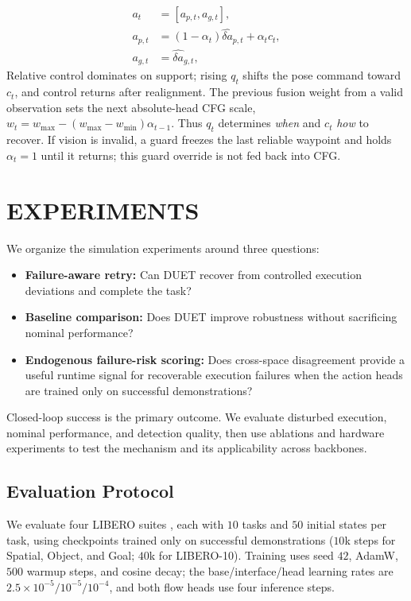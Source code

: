 \documentclass[letterpaper, 10 pt, conference]{ieeeconf}
\begin{document}
\begin{align}
    a_t &= [a_{p,t},a_{g,t}], \\
    a_{p,t} &= (1-\alpha_t)\hat{\delta a}_{p,t} + \alpha_t c_t, \\
    a_{g,t} &= \hat{\delta a}_{g,t},
    \label{eq:fused_action}
\end{align}
Relative control dominates on support; rising $q_t$ shifts the pose command toward $c_t$, and control returns after realignment. The previous fusion weight from a valid observation sets the next absolute-head CFG scale, $w_t = w_{\max}-(w_{\max}-w_{\min})\alpha_{t-1}$. Thus $q_t$ determines \emph{when} and $c_t$ \emph{how} to recover. If vision is invalid, a guard freezes the last reliable waypoint and holds $\alpha_t{=}1$ until it returns; this guard override is not fed back into CFG.

\section{EXPERIMENTS}
\label{sec:experiments}

\begin{samepage}
We organize the simulation experiments around three questions:
\begin{itemize}
    \setlength{\itemsep}{0pt}
    \setlength{\parsep}{0pt}
    \setlength{\topsep}{2pt}
    \item[\textbf{(Q1)}] \textbf{Failure-aware retry:} Can DUET recover from controlled execution deviations and complete the task?
    \item[\textbf{(Q2)}] \textbf{Baseline comparison:} Does DUET improve robustness without sacrificing nominal performance?
    \item[\textbf{(Q3)}] \textbf{Endogenous failure-risk scoring:} Does cross-space disagreement provide a useful runtime signal for recoverable execution failures when the action heads are trained only on successful demonstrations?
\end{itemize}
Closed-loop success is the primary outcome. We evaluate disturbed execution, nominal performance, and detection quality, then use ablations and hardware experiments to test the mechanism and its applicability across backbones.
\end{samepage}

\subsection{Evaluation Protocol}
\label{sec:protocol}
We evaluate four LIBERO suites \cite{libero}, each with $10$ tasks and $50$ initial states per task, using checkpoints trained only on successful demonstrations ($10$k steps for Spatial, Object, and Goal; $40$k for LIBERO-10). Training uses seed $42$, AdamW, $500$ warmup steps, and cosine decay; the base/interface/head learning rates are $2.5{\times}10^{-5}/10^{-5}/10^{-4}$, and both flow heads use four inference steps.
\end{document}
